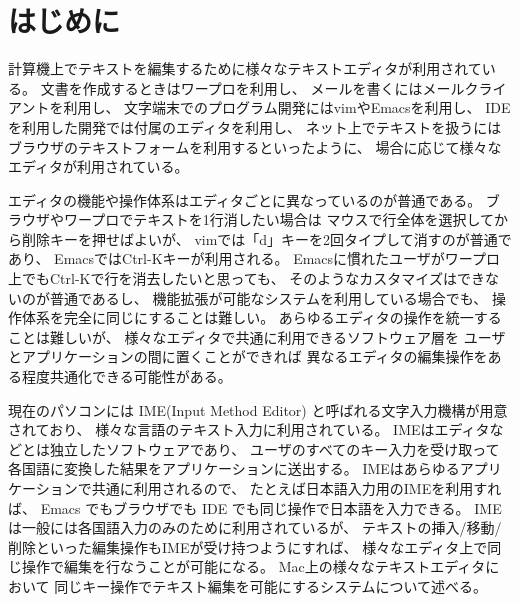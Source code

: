 \section{はじめに}

計算機上でテキストを編集するために様々なテキストエディタが利用されている。
文書を作成するときはワープロを利用し、
メールを書くにはメールクライアントを利用し、
文字端末でのプログラム開発にはvimやEmacsを利用し、
IDEを利用した開発では付属のエディタを利用し、
ネット上でテキストを扱うにはブラウザのテキストフォームを利用するといったように、
場合に応じて様々なエディタが利用されている。

エディタの機能や操作体系はエディタごとに異なっているのが普通である。
ブラウザやワープロでテキストを1行消したい場合は
マウスで行全体を選択してから削除キーを押せばよいが、
vimでは「d」キーを2回タイプして消すのが普通であり、
EmacsではCtrl-Kキーが利用される。
Emacsに慣れたユーザがワープロ上でもCtrl-Kで行を消去したいと思っても、
そのようなカスタマイズはできないのが普通であるし、
機能拡張が可能なシステムを利用している場合でも、
操作体系を完全に同じにすることは難しい。
%
あらゆるエディタの操作を統一することは難しいが、
様々なエディタで共通に利用できるソフトウェア層を
ユーザとアプリケーションの間に置くことができれば
異なるエディタの編集操作をある程度共通化できる可能性がある。

現在のパソコンには IME(Input Method Editor) と呼ばれる文字入力機構が用意されており、
様々な言語のテキスト入力に利用されている。
IMEはエディタなどとは独立したソフトウェアであり、
ユーザのすべてのキー入力を受け取って
各国語に変換した結果をアプリケーションに送出する。
IMEはあらゆるアプリケーションで共通に利用されるので、
たとえば日本語入力用のIMEを利用すれば、
Emacs でもブラウザでも IDE でも同じ操作で日本語を入力できる。
IMEは一般には各国語入力のみのために利用されているが、
テキストの挿入/移動/削除といった編集操作もIMEが受け持つようにすれば、
様々なエディタ上で同じ操作で編集を行なうことが可能になる。
%
Mac上の様々なテキストエディタにおいて
同じキー操作でテキスト編集を可能にする{\system}システムについて述べる。


